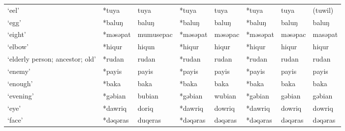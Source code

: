 \begin{landscape}
\begin{longtable}[c]{@{}p{3cm}<{\raggedright}p{2.75cm}<{\raggedright}p{2.75cm}<{\raggedright}p{2.75cm}<{\raggedright}p{2.75cm}<{\raggedright}p{2.75cm}<{\raggedright}p{2.75cm}<{\raggedright}p{2.75cm}<{\raggedright}@{}}
`eel'                                                & *tuya              & tuya                           & *tuya              & tuya                       & *tuya            & tuya                     & (tuwil)                           \\
`egg'                                                & *baluŋ             & baluŋ                          & *baluŋ             & baluŋ                      & *baluŋ           & baluŋ                    & baluŋ                             \\
`eight'                                              & *məsəpat           & mumusepac                      & *məsəpat           & məsəpac                    & *məsəpat         & məsəpac                  & masəpat                           \\
`elbow'                                              & *hiqur             & hiqun                          & *hiqur             & hiqur                      & *hiqur           & hiqur                    & hiqur                             \\
`elderly person; ancestor; old'                      & *rudan             & rudan                          & *rudan             & rudan                      & *rudan           & rudan                    & rudan                             \\
`enemy'                                              & *payis             & payis                          & *payis             & payis                      & *payis           & payis                    & payis                             \\
`enough'                                             & *baka              & baka                           & *baka              & baka                       & *baka            & baka                     & baka                              \\
`evening'                                            & *gəbian            & bubian                         & *gəbian            & wubian                     & *gəbian          & gəbian                   & gəbian                            \\
`eye'                                                & *dawriq            & doriq                          & *dawriq            & dowriq                     & *dawriq          & dowriq                   & dowriq                            \\
`face'                                               & *dəqəras           & duqeras                        & *dəqəras           & dəqəras                    & *dəqəras         & dəqəras                  & dəqəras                           \\

\end{longtable}
\end{landscape}
